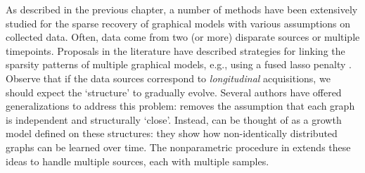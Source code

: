 As described in the previous chapter, a number of methods have been extensively studied for 
the sparse recovery of graphical models
with various assumptions on collected data.
Often, data come from two (or more) disparate sources or multiple timepoints.
Proposals in the literature have 
described strategies for linking the sparsity patterns of multiple graphical models, e.g., using a fused lasso 
penalty \citep{danaher2014joint,yang2015fused}. Observe that 
if the data sources correspond to {\em longitudinal} acquisitions, we should expect 
the `structure' to gradually evolve.
Several authors have offered generalizations to address this problem: \cite{zhou2010time} removes the assumption
that each graph is independent and structurally `close'.
Instead, \cite{zhou2010time} can be thought of as a growth model \citep{mcardle2000introduction} defined on these structures: they show how non-identically distributed graphs can be learned over time. 
The nonparametric procedure in \cite{qiu2015joint} extends these ideas
to handle multiple sources, each with multiple samples.

